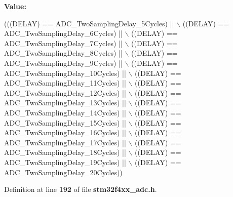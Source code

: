 {\bfseries Value\+:}
\begin{DoxyCode}
(((DELAY) == ADC_TwoSamplingDelay_5Cycles) || \(\backslash\)
                                      ((DELAY) == ADC_TwoSamplingDelay_6Cycles) || \(\backslash\)
                                      ((DELAY) == ADC_TwoSamplingDelay_7Cycles) || \(\backslash\)
                                      ((DELAY) == ADC_TwoSamplingDelay_8Cycles) || \(\backslash\)
                                      ((DELAY) == ADC_TwoSamplingDelay_9Cycles) || \(\backslash\)
                                      ((DELAY) == ADC_TwoSamplingDelay_10Cycles) || \(\backslash\)
                                      ((DELAY) == ADC_TwoSamplingDelay_11Cycles) || \(\backslash\)
                                      ((DELAY) == ADC_TwoSamplingDelay_12Cycles) || \(\backslash\)
                                      ((DELAY) == ADC_TwoSamplingDelay_13Cycles) || \(\backslash\)
                                      ((DELAY) == ADC_TwoSamplingDelay_14Cycles) || \(\backslash\)
                                      ((DELAY) == ADC_TwoSamplingDelay_15Cycles) || \(\backslash\)
                                      ((DELAY) == ADC_TwoSamplingDelay_16Cycles) || \(\backslash\)
                                      ((DELAY) == ADC_TwoSamplingDelay_17Cycles) || \(\backslash\)
                                      ((DELAY) == ADC_TwoSamplingDelay_18Cycles) || \(\backslash\)
                                      ((DELAY) == ADC_TwoSamplingDelay_19Cycles) || \(\backslash\)
                                      ((DELAY) == ADC_TwoSamplingDelay_20Cycles))
\end{DoxyCode}


Definition at line \textbf{ 192} of file \textbf{ stm32f4xx\+\_\+adc.\+h}.

